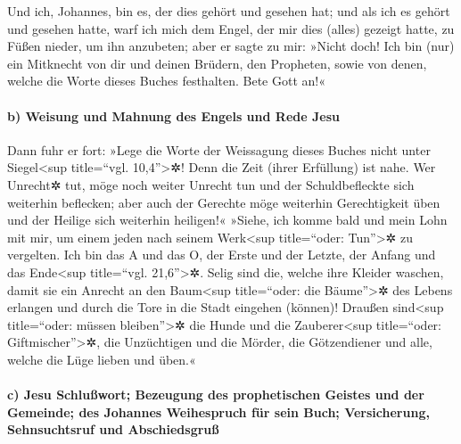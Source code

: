  Und ich, Johannes, bin es, der dies gehört und gesehen
hat; und als ich es gehört und gesehen hatte, warf ich mich dem Engel,
der mir dies (alles) gezeigt hatte, zu Füßen nieder, um ihn anzubeten;
 aber er sagte zu mir: »Nicht doch! Ich bin (nur) ein
Mitknecht von dir und deinen Brüdern, den Propheten, sowie von denen,
welche die Worte dieses Buches festhalten. Bete Gott an!«

\hypertarget{b-weisung-und-mahnung-des-engels-und-rede-jesu}{%
\paragraph{b) Weisung und Mahnung des Engels und Rede
Jesu}\label{b-weisung-und-mahnung-des-engels-und-rede-jesu}}

 Dann fuhr er fort: »Lege die Worte der Weissagung dieses
Buches nicht unter Siegel\textless sup title=``vgl. 10,4''\textgreater✲!
Denn die Zeit (ihrer Erfüllung) ist nahe.  Wer Unrecht✲
tut, möge noch weiter Unrecht tun und der Schuldbefleckte sich weiterhin
beflecken; aber auch der Gerechte möge weiterhin Gerechtigkeit üben und
der Heilige sich weiterhin heiligen!«  »Siehe, ich komme
bald und mein Lohn mit mir, um einem jeden nach seinem Werk\textless sup
title=``oder: Tun''\textgreater✲ zu vergelten.  Ich bin
das A und das O, der Erste und der Letzte, der Anfang und das
Ende\textless sup title=``vgl. 21,6''\textgreater✲. 
Selig sind die, welche ihre Kleider waschen, damit sie ein Anrecht an
den Baum\textless sup title=``oder: die Bäume''\textgreater✲ des Lebens
erlangen und durch die Tore in die Stadt eingehen (können)!
 Draußen sind\textless sup title=``oder: müssen
bleiben''\textgreater✲ die Hunde und die Zauberer\textless sup
title=``oder: Giftmischer''\textgreater✲, die Unzüchtigen und die
Mörder, die Götzendiener und alle, welche die Lüge lieben und üben.«

\hypertarget{c-jesu-schluuxdfwort-bezeugung-des-prophetischen-geistes-und-der-gemeinde-des-johannes-weihespruch-fuxfcr-sein-buch-versicherung-sehnsuchtsruf-und-abschiedsgruuxdf}{%
\paragraph{c) Jesu Schlußwort; Bezeugung des prophetischen Geistes und
der Gemeinde; des Johannes Weihespruch für sein Buch; Versicherung,
Sehnsuchtsruf und
Abschiedsgruß}\label{c-jesu-schluuxdfwort-bezeugung-des-prophetischen-geistes-und-der-gemeinde-des-johannes-weihespruch-fuxfcr-sein-buch-versicherung-sehnsuchtsruf-und-abschiedsgruuxdf}}

